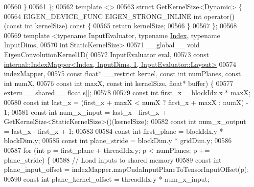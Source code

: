 \begin{DoxyCode}
00560   \}
00561 \};
00562 \textcolor{keyword}{template} <>
00563 \textcolor{keyword}{struct }GetKernelSize<Dynamic> \{
00564   EIGEN\_DEVICE\_FUNC EIGEN\_STRONG\_INLINE \textcolor{keywordtype}{int} operator() (\textcolor{keyword}{const} \textcolor{keywordtype}{int} kernelSize)\textcolor{keyword}{ const }\{
00565     \textcolor{keywordflow}{return} kernelSize;
00566   \}
00567 \};
00568 
00569 \textcolor{keyword}{template} <\textcolor{keyword}{typename} InputEvaluator, \textcolor{keyword}{typename} \hyperlink{namespace_eigen_a62e77e0933482dafde8fe197d9a2cfde}{Index}, \textcolor{keyword}{typename} InputDims,
00570           \textcolor{keywordtype}{int} StaticKernelSize>
00571 \_\_global\_\_ \textcolor{keywordtype}{void} EigenConvolutionKernel1D(
00572     InputEvaluator eval,
00573     \textcolor{keyword}{const} \hyperlink{class_eigen_1_1internal_1_1_index_mapper}{internal::IndexMapper<Index, InputDims, 1, InputEvaluator::Layout>}
00574         indexMapper,
00575     \textcolor{keyword}{const} \textcolor{keywordtype}{float}* \_\_restrict kernel, \textcolor{keyword}{const} \textcolor{keywordtype}{int} numPlanes, \textcolor{keyword}{const} \textcolor{keywordtype}{int} numX,
00576     \textcolor{keyword}{const} \textcolor{keywordtype}{int} maxX, \textcolor{keyword}{const} \textcolor{keywordtype}{int} kernelSize, \textcolor{keywordtype}{float}* buffer) \{
00577   \textcolor{keyword}{extern} \_\_shared\_\_ \textcolor{keywordtype}{float} s[];
00578 
00579   \textcolor{keyword}{const} \textcolor{keywordtype}{int} first\_x = blockIdx.x * maxX;
00580   \textcolor{keyword}{const} \textcolor{keywordtype}{int} last\_x = (first\_x + maxX < numX ? first\_x + maxX : numX) - 1;
00581   \textcolor{keyword}{const} \textcolor{keywordtype}{int} num\_x\_input = last\_x - first\_x + GetKernelSize<StaticKernelSize>()(kernelSize);
00582   \textcolor{keyword}{const} \textcolor{keywordtype}{int} num\_x\_output = last\_x - first\_x + 1;
00583 
00584   \textcolor{keyword}{const} \textcolor{keywordtype}{int} first\_plane = blockIdx.y * blockDim.y;
00585   \textcolor{keyword}{const} \textcolor{keywordtype}{int} plane\_stride = blockDim.y * gridDim.y;
00586 
00587   \textcolor{keywordflow}{for} (\textcolor{keywordtype}{int} p = first\_plane + threadIdx.y; p < numPlanes; p += plane\_stride) \{
00588     \textcolor{comment}{// Load inputs to shared memory}
00589     \textcolor{keyword}{const} \textcolor{keywordtype}{int} plane\_input\_offset = indexMapper.mapCudaInputPlaneToTensorInputOffset(p);
00590     \textcolor{keyword}{const} \textcolor{keywordtype}{int} plane\_kernel\_offset = threadIdx.y * num\_x\_input;

\end{DoxyCode}
